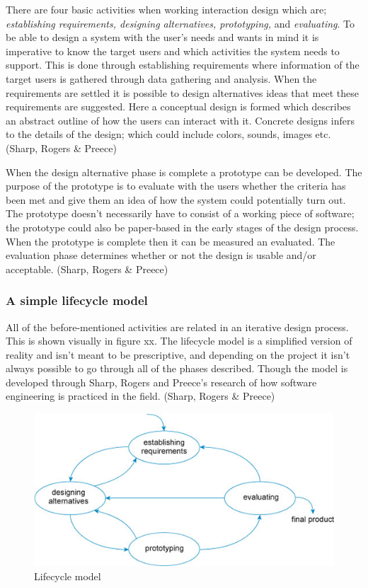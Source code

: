 There are four basic activities when working interaction design which are; \textit{establishing requirements, designing alternatives, prototyping,} and \textit{evaluating}. To be able to design a system with the user’s needs and wants in mind it is imperative to know the target users and which activities the system needs to support. This is done through establishing requirements where information of the target users is gathered through data gathering and analysis. When the requirements are settled it is possible to design alternatives ideas that meet these requirements are suggested. Here a conceptual design is formed which describes an abstract outline of how the users can interact with it. Concrete designs infers to the details of the design; which could include colors, sounds, images etc. (Sharp, Rogers \& Preece)

When the design alternative phase is complete a prototype can be developed. The purpose of the prototype is to evaluate with the users whether the criteria has been met and give them an idea of how the system could potentially turn out. The prototype doesn’t necessarily have to consist of a working piece of software; the prototype could also be paper-based in the early stages of the design process. When the prototype is complete then it can be measured an evaluated. The evaluation phase determines whether or not the design is usable and/or acceptable. (Sharp, Rogers \& Preece)

\subsubsection{A simple lifecycle model}
All of the before-mentioned activities are related in an iterative design process. This is shown visually in figure xx. The lifecycle model is a simplified version of reality and isn’t meant to be prescriptive, and depending on the project it isn’t always possible to go through all of the phases described. Though the model is developed through Sharp, Rogers and Preece’s research of how software engineering is practiced in the field. (Sharp, Rogers \& Preece)

\begin{figure}[h]
	\includegraphics[width=1\textwidth]{billeder/lifecycle.png}
	\caption{Lifecycle model}
\end{figure}

